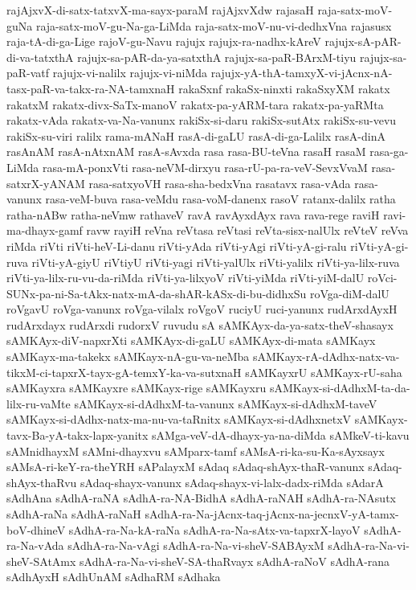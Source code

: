 {rajAjxvX-di-satx-tatxvX-ma-sayx-paraM
rajAjxvXdw
rajasaH
raja-satx-moV-guNa
raja-satx-moV-gu-Na-ga-LiMda
raja-satx-moV-nu-vi-dedhxVna
rajasusx
raja-tA-di-ga-Lige
rajoV-gu-Navu
rajujx
rajujx-ra-nadhx-kAreV
rajujx-sA-pAR-di-va-tatxthA
rajujx-sa-pAR-da-ya-satxthA
rajujx-sa-paR-BArxM-tiyu
rajujx-sa-paR-vatf
rajujx-vi-nalilx
rajujx-vi-niMda
rajujx-yA-thA-tamxyX-vi-jAcnx-nA-tasx-paR-va-takx-ra-NA-tamxnaH
rakaSxnf
rakaSx-ninxti
rakaSxyXM
rakatx
rakatxM
rakatx-divx-SaTx-manoV
rakatx-pa-yARM-tara
rakatx-pa-yaRMta
rakatx-vAda
rakatx-va-Na-vanunx
rakiSx-si-daru
rakiSx-sutAtx
rakiSx-su-vevu
rakiSx-su-viri
ralilx
rama-mANaH
rasA-di-gaLU
rasA-di-ga-Lalilx
rasA-dinA
rasAnAM
rasA-nAtxnAM
rasA-sAvxda
rasa
rasa-BU-teVna
rasaH
rasaM
rasa-ga-LiMda
rasa-mA-ponxVti
rasa-neVM-dirxyu
rasa-rU-pa-ra-veV-SevxVvaM
rasa-satxrX-yANAM
rasa-satxyoVH
rasa-sha-bedxVna
rasatavx
rasa-vAda
rasa-vanunx
rasa-veM-buva
rasa-veMdu
rasa-voM-danenx
rasoV
ratanx-dalilx
ratha
ratha-nABw
ratha-neVmw
rathaveV
ravA
ravAyxdAyx
rava
rava-rege
raviH
ravi-ma-dhayx-gamf
ravw
rayiH
reVna
reVtasa
reVtasi
reVta-sisx-nalUlx
reVteV
reVva
riMda
riVti
riVti-heV-Li-danu
riVti-yAda
riVti-yAgi
riVti-yA-gi-ralu
riVti-yA-gi-ruva
riVti-yA-giyU
riVtiyU
riVti-yagi
riVti-yalUlx
riVti-yalilx
riVti-ya-lilx-ruva
riVti-ya-lilx-ru-vu-da-riMda
riVti-ya-lilxyoV
riVti-yiMda
riVti-yiM-dalU
roVci-SUNx-pa-ni-Sa-tAkx-natx-mA-da-shAR-kASx-di-bu-didhxSu
roVga-diM-dalU
roVgavU
roVga-vanunx
roVga-vilalx
roVgoV
ruciyU
ruci-yanunx
rudArxdAyxH
rudArxdayx
rudArxdi
rudorxV
ruvudu
sA
sAMKAyx-da-ya-satx-theV-shasayx
sAMKAyx-diV-napxrXti
sAMKAyx-di-gaLU
sAMKAyx-di-mata
sAMKayx
sAMKayx-ma-takekx
sAMKayx-nA-gu-va-neMba
sAMKayx-rA-dAdhx-natx-va-tikxM-ci-tapxrX-tayx-gA-temxY-ka-va-sutxnaH
sAMKayxrU
sAMKayx-rU-saha
sAMKayxra
sAMKayxre
sAMKayx-rige
sAMKayxru
sAMKayx-si-dAdhxM-ta-da-lilx-ru-vaMte
sAMKayx-si-dAdhxM-ta-vanunx
sAMKayx-si-dAdhxM-taveV
sAMKayx-si-dAdhx-natx-ma-nu-va-taRnitx
sAMKayx-si-dAdhxnetxV
sAMKayx-tavx-Ba-yA-takx-lapx-yanitx
sAMga-veV-dA-dhayx-ya-na-diMda
sAMkeV-ti-kavu
sAMnidhayxM
sAMni-dhayxvu
sAMparx-tamf
sAMsA-ri-ka-su-Ka-sAyxsayx
sAMsA-ri-keY-ra-theYRH
sAPalayxM
sAdaq
sAdaq-shAyx-thaR-vanunx
sAdaq-shAyx-thaRvu
sAdaq-shayx-vanunx
sAdaq-shayx-vi-lalx-dadx-riMda
sAdarA
sAdhAna
sAdhA-raNA
sAdhA-ra-NA-BidhA
sAdhA-raNAH
sAdhA-ra-NAsutx
sAdhA-raNa
sAdhA-raNaH
sAdhA-ra-Na-jAcnx-taq-jAcnx-na-jecnxV-yA-tamx-boV-dhineV
sAdhA-ra-Na-kA-raNa
sAdhA-ra-Na-sAtx-va-tapxrX-layoV
sAdhA-ra-Na-vAda
sAdhA-ra-Na-vAgi
sAdhA-ra-Na-vi-sheV-SABAyxM
sAdhA-ra-Na-vi-sheV-SAtAmx
sAdhA-ra-Na-vi-sheV-SA-thaRvayx
sAdhA-raNoV
sAdhA-rana
sAdhAyxH
sAdhUnAM
sAdhaRM
sAdhaka
}

